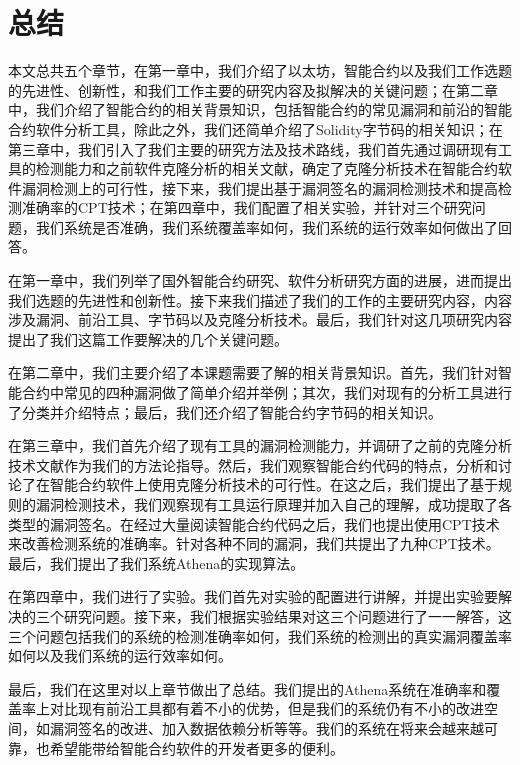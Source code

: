 \chapter{总结}

本文总共五个章节，在第一章中，我们介绍了以太坊，智能合约以及我们工作选题的先进性、创新性，和我们工作主要的研究内容及拟解决的关键问题；在第二章中，我们介绍了智能合约的相关背景知识，包括智能合约的常见漏洞和前沿的智能合约软件分析工具，除此之外，我们还简单介绍了Solidity字节码的相关知识；在第三章中，我们引入了我们主要的研究方法及技术路线，我们首先通过调研现有工具的检测能力和之前软件克隆分析的相关文献，确定了克隆分析技术在智能合约软件漏洞检测上的可行性，接下来，我们提出基于漏洞签名的漏洞检测技术和提高检测准确率的CPT技术；在第四章中，我们配置了相关实验，并针对三个研究问题，我们系统是否准确，我们系统覆盖率如何，我们系统的运行效率如何做出了回答。

在第一章中，我们列举了国外智能合约研究、软件分析研究方面的进展，进而提出我们选题的先进性和创新性。接下来我们描述了我们的工作的主要研究内容，内容涉及漏洞、前沿工具、字节码以及克隆分析技术。最后，我们针对这几项研究内容提出了我们这篇工作要解决的几个关键问题。

在第二章中，我们主要介绍了本课题需要了解的相关背景知识。首先，我们针对智能合约中常见的四种漏洞做了简单介绍并举例；其次，我们对现有的分析工具进行了分类并介绍特点；最后，我们还介绍了智能合约字节码的相关知识。

在第三章中，我们首先介绍了现有工具的漏洞检测能力，并调研了之前的克隆分析技术文献作为我们的方法论指导。然后，我们观察智能合约代码的特点，分析和讨论了在智能合约软件上使用克隆分析技术的可行性。在这之后，我们提出了基于规则的漏洞检测技术，我们观察现有工具运行原理并加入自己的理解，成功提取了各类型的漏洞签名。在经过大量阅读智能合约代码之后，我们也提出使用CPT技术来改善检测系统的准确率。针对各种不同的漏洞，我们共提出了九种CPT技术。最后，我们提出了我们系统Athena的实现算法。

在第四章中，我们进行了实验。我们首先对实验的配置进行讲解，并提出实验要解决的三个研究问题。接下来，我们根据实验结果对这三个问题进行了一一解答，这三个问题包括我们的系统的检测准确率如何，我们系统的检测出的真实漏洞覆盖率如何以及我们系统的运行效率如何。

最后，我们在这里对以上章节做出了总结。我们提出的Athena系统在准确率和覆盖率上对比现有前沿工具都有着不小的优势，但是我们的系统仍有不小的改进空间，如漏洞签名的改进、加入数据依赖分析等等。我们的系统在将来会越来越可靠，也希望能带给智能合约软件的开发者更多的便利。